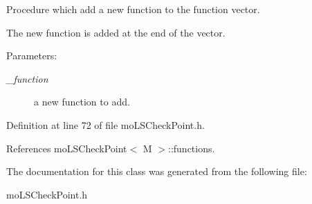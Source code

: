 Procedure which add a new function to the function vector. 

The new function is added at the end of the vector. \begin{Desc}
\item[Parameters:]
\begin{description}
\item[{\em \_\-function}]a new function to add. \end{description}
\end{Desc}


Definition at line 72 of file moLSCheckPoint.h.

References moLSCheckPoint$<$ M $>$::functions.

The documentation for this class was generated from the following file:\begin{CompactItemize}
\item 
moLSCheckPoint.h\end{CompactItemize}
